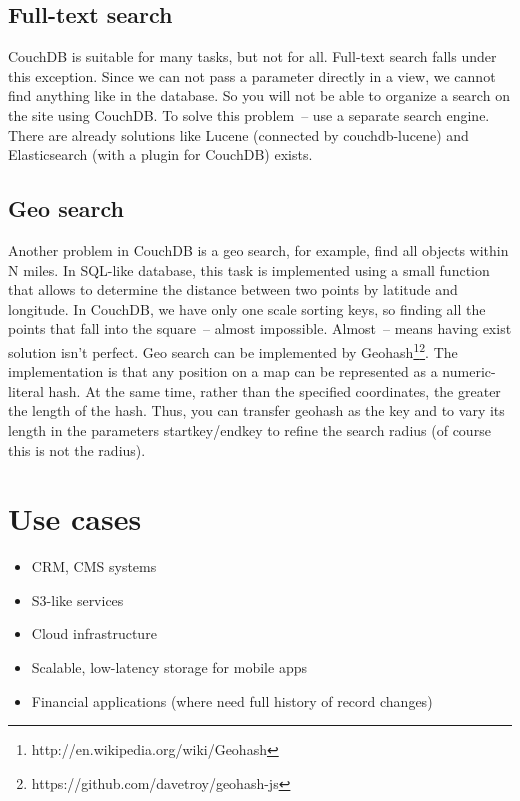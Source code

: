 \subsection{Full-text search}

CouchDB is suitable for many tasks, but not for all. Full-text search falls under this exception. Since we can not pass a parameter directly in a view, we cannot find anything like in the database. So you will not be able to organize a search on the site using CouchDB. To solve this problem~-- use a separate search engine. There are already solutions like Lucene (connected by couchdb-lucene) and Elasticsearch (with a plugin for CouchDB) exists.

\subsection{Geo search}

Another problem in CouchDB is a geo search, for example, find all objects within N miles. In SQL-like database, this task is implemented using a small function that allows to determine the distance between two points by latitude and longitude. In CouchDB, we have only one scale sorting keys, so finding all the points that fall into the square~-- almost impossible. Almost~-- means having exist solution isn’t perfect. Geo search can be implemented by Geohash\footnote{http://en.wikipedia.org/wiki/Geohash}\footnote{https://github.com/davetroy/geohash-js}. The implementation is that any position on a map can be represented as a numeric-literal hash. At the same time, rather than the specified coordinates, the greater the length of the hash. Thus, you can transfer geohash as the key and to vary its length in the parameters startkey/endkey to refine the search radius (of course this is not the radius).


\section{Use cases}

\begin{itemize}
  \item CRM, CMS systems
  \item S3-like services
  \item Cloud infrastructure
  \item Scalable, low-latency storage for mobile apps
  \item Financial applications (where need full history of record changes)
\end{itemize}